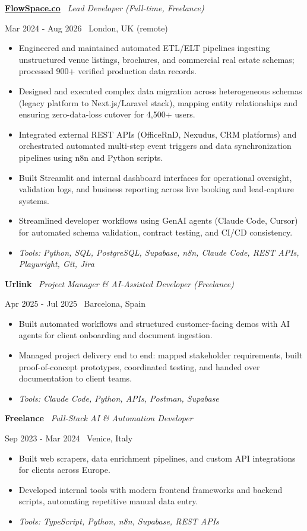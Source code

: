 \documentclass[a4paper,10pt]{article}
\newcommand{\role}[4]{%
 \vspace{2pt}\noindent
 \begin{minipage}[t]{0.70\textwidth}\raggedright\textbf{#1} \textbullet\ \textit{#3}\end{minipage}%
 \hfill
 \begin{minipage}[t]{0.28\textwidth}\raggedleft\footnotesize\color{gray}#2 \textbullet\ #4\end{minipage}%
 \vspace{1pt}%
}
\begin{document}
\role{\href{https://flowspace.co}{FlowSpace.co}}{Mar 2024 - Aug 2026}{Lead Developer (Full-time, Freelance)}{London, UK (remote)}
\begin{itemize}
 \item Engineered and maintained automated ETL/ELT pipelines ingesting unstructured venue listings, brochures, and commercial real estate schemas; processed 900+ verified production data records.
 \item Designed and executed complex data migration across heterogeneous schemas (legacy platform to Next.js/Laravel stack), mapping entity relationships and ensuring zero-data-loss cutover for 4,500+ users.
 \item Integrated external REST APIs (OfficeRnD, Nexudus, CRM platforms) and orchestrated automated multi-step event triggers and data synchronization pipelines using n8n and Python scripts.
 \item Built Streamlit and internal dashboard interfaces for operational oversight, validation logs, and business reporting across live booking and lead-capture systems.
 \item Streamlined developer workflows using GenAI agents (Claude Code, Cursor) for automated schema validation, contract testing, and CI/CD consistency.
 \item \textit{Tools: Python, SQL, PostgreSQL, Supabase, n8n, Claude Code, REST APIs, Playwright, Git, Jira}
\end{itemize}

\role{Urlink}{Apr 2025 - Jul 2025}{Project Manager \& AI-Assisted Developer (Freelance)}{Barcelona, Spain}
\begin{itemize}
 \item Built automated workflows and structured customer-facing demos with AI agents for client onboarding and document ingestion.
 \item Managed project delivery end to end: mapped stakeholder requirements, built proof-of-concept prototypes, coordinated testing, and handed over documentation to client teams.
 \item \textit{Tools: Claude Code, Python, APIs, Postman, Supabase}
\end{itemize}

\role{Freelance}{Sep 2023 - Mar 2024}{Full-Stack AI \& Automation Developer}{Venice, Italy}
\begin{itemize}
 \item Built web scrapers, data enrichment pipelines, and custom API integrations for clients across Europe.
 \item Developed internal tools with modern frontend frameworks and backend scripts, automating repetitive manual data entry.
 \item \textit{Tools: TypeScript, Python, n8n, Supabase, REST APIs}
\end{itemize}
\end{document}
